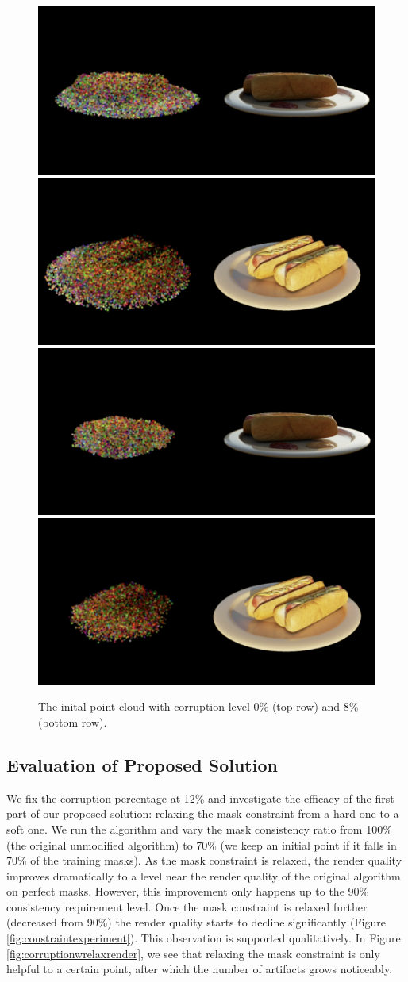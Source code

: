 \documentclass[10pt,twocolumn,letterpaper]{article}
\begin{document}
\begin{figure}[h]
\centering
    \includegraphics[width=0.45\linewidth]{figures/ogmask_1.png}
    \includegraphics[width=0.45\linewidth]{figures/ogmask_2.png} 
    \includegraphics[width=0.45\linewidth]{figures/8pcorrupt-mask-1.png}
    \includegraphics[width=0.45\linewidth]{figures/8pcorrupt-mask-2.png} 
    \caption{The inital point cloud with corruption level 0\% (top row) and 8\% (bottom row). }
\label{fig:maskoninit}
\end{figure}

\subsection{Evaluation of Proposed Solution}

We fix the corruption percentage at 12\% and investigate the efficacy of the first part of our proposed solution: relaxing the mask constraint from a hard one to a soft one. We run the algorithm and vary the mask consistency ratio from 100\% (\ie the original unmodified algorithm) to 70\% (\ie we keep an initial point if it falls in 70\% of the training masks). As the mask constraint is relaxed, the render quality improves dramatically to a level near the render quality of the original algorithm on perfect masks. However, this improvement only happens up to the 90\% consistency requirement level. Once the mask constraint is relaxed further (\ie decreased from 90\%) the render quality starts to decline significantly (Figure \ref{fig:constraintexperiment}). This observation is supported qualitatively. In Figure \ref{fig:corruptionwrelaxrender}, we see that relaxing the mask constraint is only helpful to a certain point, after which the number of artifacts grows noticeably.
\end{document}

